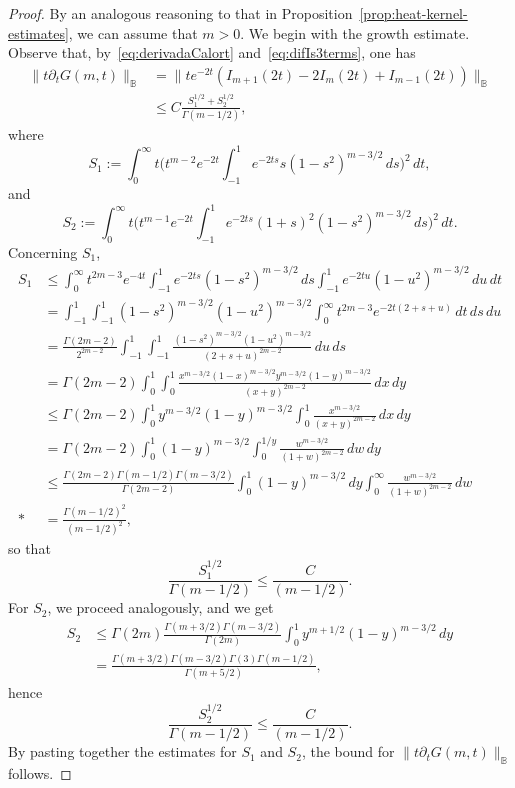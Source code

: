 \documentclass[11pt]{amsart}
\numberwithin{equation}{section}
\theoremstyle{plain}
\theoremstyle{remark}
\begin{document}
\begin{proof}
By an analogous reasoning to that in Proposition~\ref{prop:heat-kernel-estimates}, we can assume that $m>0$.
We begin with the growth estimate. Observe that, by~\eqref{eq:derivadaCalort} and~\eqref{eq:difIs3terms}, one has
\begin{align*}
\|t\partial_tG(m,t)\|_{\mathbb{B}}
&= \|te^{-2t} (I_{m+1}(2t) - 2I_{m}(2t) + I_{m-1}(2t))\|_{\mathbb{B}}\\
&\le C\frac{S_1^{1/2}+S_2^{1/2}}{\Gamma(m-1/2)},
\end{align*}
where
\[
S_1 := \int_0^{\infty}t\Big(t^{m-2}e^{-2t}
\int_{-1}^1e^{-2ts}s(1-s^2)^{m-3/2}\,ds\Big)^2\,dt,
\]
and
\[
S_2 := \int_0^{\infty}t\Big(t^{m-1}e^{-2t}
\int_{-1}^1e^{-2ts}(1+s)^2(1-s^2)^{m-3/2}\,ds\Big)^2\,dt.
\]
Concerning $S_1$,
\begin{align*}
S_1 &\le \int_0^{\infty}t^{2m-3}e^{-4t}\int_{-1}^1e^{-2ts}(1-s^2)^{m-3/2}\,ds
\int_{-1}^1e^{-2tu}(1-u^2)^{m-3/2}\,du\,dt \\
&= \int_{-1}^1\int_{-1}^1(1-s^2)^{m-3/2}(1-u^2)^{m-3/2}
\int_0^{\infty}t^{2m-3}e^{-2t(2+s+u)}\,dt\,ds\,du \\
&= \frac{\Gamma(2m-2)}{2^{2m-2}}\int_{-1}^1\int_{-1}^1
\frac{(1-s^2)^{m-3/2}(1-u^2)^{m-3/2}}{(2+s+u)^{2m-2}}\,du\,ds \\
&= \Gamma(2m-2)\int_{0}^1
\int_{0}^1 \frac{x^{m-3/2}(1-x)^{m-3/2}y^{m-3/2}(1-y)^{m-3/2}}
{(x+y)^{2m-2}}\,dx\,dy
\\
&\le \Gamma(2m-2)\int_{0}^1y^{m-3/2}(1-y)^{m-3/2}
\int_{0}^1 \frac{x^{m-3/2}}
{(x+y)^{2m-2}}\,dx\,dy
\\
&= \Gamma(2m-2)\int_{0}^1(1-y)^{m-3/2}\int_{0}^{1/y}
\frac{w^{m-3/2}}
{(1+w)^{2m-2}}\,dw\,dy
\\
&\le \frac{\Gamma(2m-2)\Gamma(m-1/2)\Gamma(m-3/2)}{\Gamma(2m-2)}
\int_{0}^1(1-y)^{m-3/2}\,dy\int_0^{\infty}\frac{w^{m-3/2}}
{(1+w)^{2m-2}}\,dw \\*
&= \frac{\Gamma(m-1/2)^2}{(m-1/2)^2},
\end{align*}
so that
\[
\frac{S_1^{1/2}}{\Gamma(m-1/2)}\le\frac{C}{(m-1/2)}.
\]
For $S_2$, we proceed analogously, and we get
\begin{align*}
S_2 &\le \Gamma(2m)\frac{\Gamma(m+3/2)\Gamma(m-3/2)}
{\Gamma(2m)}\int_{0}^1y^{m+1/2}(1-y)^{m-3/2} \,dy \\
&= \frac{\Gamma(m+3/2)\Gamma(m-3/2)\Gamma(3)\Gamma(m-1/2)}{\Gamma(m+5/2)},
\end{align*}
hence
\[
\frac{S_2^{1/2}}{\Gamma(m-1/2)}\le\frac{C}{(m-1/2)}.
\]
By pasting together the estimates for $S_1$ and $S_2$, the bound for $\|t\partial_tG(m,t)\|_{\mathbb{B}}$ follows.


\end{proof}
\end{document}
